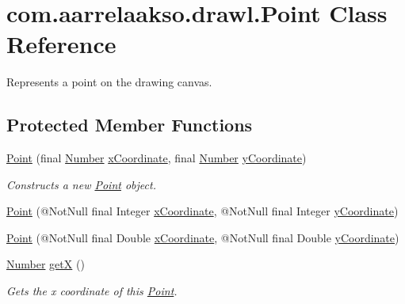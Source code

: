 \hypertarget{classcom_1_1aarrelaakso_1_1drawl_1_1_point}{}\section{com.\+aarrelaakso.\+drawl.\+Point Class Reference}
\label{classcom_1_1aarrelaakso_1_1drawl_1_1_point}


Represents a point on the drawing canvas.  


\subsection*{Protected Member Functions}
\begin{DoxyCompactItemize}
\item 
\hyperlink{classcom_1_1aarrelaakso_1_1drawl_1_1_point_a1eb402d4971df738ea66227c7c12cb70}{Point} (final \hyperlink{interfacecom_1_1aarrelaakso_1_1drawl_1_1_number}{Number} \hyperlink{classcom_1_1aarrelaakso_1_1drawl_1_1_point_aa5144c5cca82c86f845bead6d4a51041}{x\+Coordinate}, final \hyperlink{interfacecom_1_1aarrelaakso_1_1drawl_1_1_number}{Number} \hyperlink{classcom_1_1aarrelaakso_1_1drawl_1_1_point_ab84afea50a66677c32ed2fd3100838c7}{y\+Coordinate})
\begin{DoxyCompactList}\small\item\em Constructs a new \hyperlink{classcom_1_1aarrelaakso_1_1drawl_1_1_point}{Point} object. \end{DoxyCompactList}\item 
\hyperlink{classcom_1_1aarrelaakso_1_1drawl_1_1_point_afb3376a5897946911a2230562fff07cf}{Point} (@Not\+Null final Integer \hyperlink{classcom_1_1aarrelaakso_1_1drawl_1_1_point_aa5144c5cca82c86f845bead6d4a51041}{x\+Coordinate}, @Not\+Null final Integer \hyperlink{classcom_1_1aarrelaakso_1_1drawl_1_1_point_ab84afea50a66677c32ed2fd3100838c7}{y\+Coordinate})
\item 
\hyperlink{classcom_1_1aarrelaakso_1_1drawl_1_1_point_acccdd3d1aeb08cc4315d415a546a3d95}{Point} (@Not\+Null final Double \hyperlink{classcom_1_1aarrelaakso_1_1drawl_1_1_point_aa5144c5cca82c86f845bead6d4a51041}{x\+Coordinate}, @Not\+Null final Double \hyperlink{classcom_1_1aarrelaakso_1_1drawl_1_1_point_ab84afea50a66677c32ed2fd3100838c7}{y\+Coordinate})
\item 
\hyperlink{interfacecom_1_1aarrelaakso_1_1drawl_1_1_number}{Number} \hyperlink{classcom_1_1aarrelaakso_1_1drawl_1_1_point_a39d39c84f2d05c9a2551cbc584c47bfc}{getX} ()
\begin{DoxyCompactList}\small\item\em Gets the x coordinate of this \hyperlink{classcom_1_1aarrelaakso_1_1drawl_1_1_point}{Point}. \end{DoxyCompactList}\item 

\end{DoxyCompactItemize}
